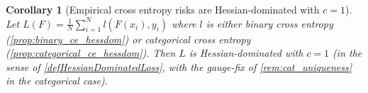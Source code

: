 \documentclass{article}
\theoremstyle{plain}
\newtheorem{corollary}[theorem]{Corollary}
\theoremstyle{definition}
\theoremstyle{remark}
\begin{document}
\begin{corollary}[Empirical cross entropy risks are Hessian-dominated with $c=1$]
\label{cor:empirical_ce_hessdom}
Let $L(F)=\frac{1}{N}\sum_{i=1}^N l(F(x_i),y_i)$ where $l$ is either binary cross entropy
(\cref{prop:binary_ce_hessdom}) or categorical cross entropy
(\cref{prop:categorical_ce_hessdom}). Then $L$ is Hessian-dominated with $c=1$
(in the sense of \cref{defHessianDominatedLoss}, with the gauge-fix of \cref{rem:cat_uniqueness}
in the categorical case).
\end{corollary}
\end{document}

